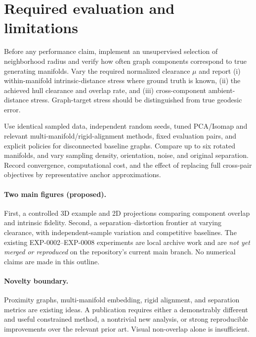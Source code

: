 \section{Required evaluation and limitations}
Before any performance claim, implement an unsupervised selection of
neighborhood radius and verify how often graph components correspond to
true generating manifolds. Vary the required normalized clearance
$\mu$ and report (i) within-manifold intrinsic-distance stress where
ground truth is known, (ii) the achieved hull clearance and overlap
rate, and (iii) cross-component ambient-distance stress.
Graph-target stress should be distinguished from true geodesic error.

Use identical sampled data, independent random seeds, tuned PCA/Isomap
and relevant multi-manifold/rigid-alignment methods, fixed evaluation
pairs, and explicit policies for disconnected baseline graphs.
Compare up to six rotated manifolds, and vary sampling density,
orientation, noise, and original separation. Record convergence,
computational cost, and the effect of replacing full cross-pair
objectives by representative anchor approximations.

\paragraph{Two main figures (proposed).}
First, a controlled 3D example and 2D projections comparing component
overlap and intrinsic fidelity. Second, a separation--distortion
frontier at varying clearance, with independent-sample variation
and competitive baselines. The existing EXP-0002--EXP-0008 experiments
are local archive work and are \emph{not yet merged or reproduced} on
the repository's current main branch. No numerical claims are made
in this outline.

\paragraph{Novelty boundary.}
Proximity graphs, multi-manifold embedding, rigid alignment, and
separation metrics are existing ideas. A publication requires either
a demonstrably different and useful constrained method, a nontrivial
new analysis, or strong reproducible improvements over the relevant
prior art. Visual non-overlap alone is insufficient.
